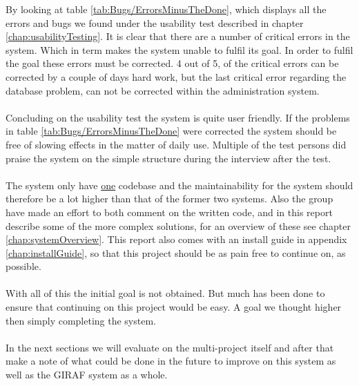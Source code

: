 By looking at table \ref{tab:Bugs/ErrorsMinusTheDone}, which displays all the errors and bugs we found under the usability test described in chapter \vref{chap:usabilityTesting}. It is clear that there are a number of critical errors in the system. Which in term makes the system unable to fulfil its goal. In order to fulfil the goal these errors must be corrected.
4 out of 5, of the critical errors can be corrected by a couple of days hard work, but the last critical error regarding the database problem, can not be corrected within the administration system.\\
\\
Concluding on the usability test the system is quite user friendly. If the problems in table \ref{tab:Bugs/ErrorsMinusTheDone} were corrected the system should be free of slowing effects in the matter of daily use. Multiple of the test persons did praise the system on the simple structure during the interview after the test.\\
\\
The system only have \underline{one} codebase and the maintainability for the system should therefore be a lot higher than that of the former two systems. Also the group have made an effort to both comment on the written code, and in this report describe some of the more complex solutions, for an overview of these see chapter \vref{chap:systemOverview}. This report also comes with an install guide in appendix \vref{chap:installGuide}, so that this project should be as pain free to continue on, as possible.\\
\\
With all of this the initial goal is not obtained. But much has been done to ensure that continuing on this project would be easy. A goal we thought higher then simply completing the system.\\
\\
In the next sections we will evaluate on the multi-project itself and after that make a note of what could be done in the future to improve on this system as well as the GIRAF system as a whole.
